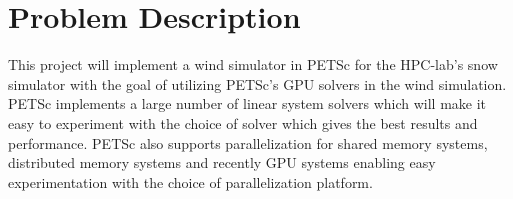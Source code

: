 \section*{Problem Description}

This project will implement a wind simulator in PETSc for the HPC-lab's snow simulator
with the goal of utilizing PETSc's GPU solvers in the wind simulation.
PETSc implements a large number of linear system solvers which will make
it easy to experiment with the choice of solver which gives the best results and
performance. PETSc also supports parallelization for shared memory systems,
distributed memory systems and recently GPU systems enabling easy experimentation
with the choice of parallelization platform.
